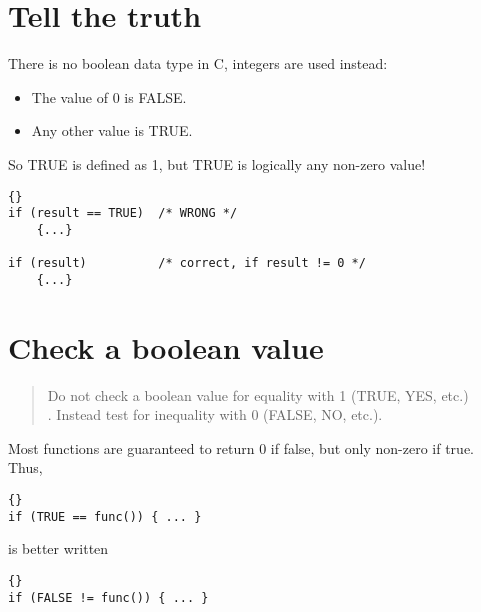 \documentclass{report}
\begin{document}
\section{Tell the truth}
There is no boolean data type in C, integers are used instead:
\begin{itemize}
\item The value of 0 is FALSE.
\item Any other value is TRUE.
\end{itemize}
So TRUE is defined as 1, but TRUE is logically any non-zero value!
\begin{lstlisting}{}
if (result == TRUE)  /* WRONG */
    {...}
	
if (result)          /* correct, if result != 0 */
    {...}
\end{lstlisting}

\section{Check a boolean value}
\begin{quote}
Do not check a boolean value for equality with 1 (TRUE, YES, etc.)\\.
Instead test for inequality with 0 (FALSE, NO, etc.).
\end{quote}
Most functions are guaranteed to return 0 if false, but only non-zero if true. Thus,
\begin{lstlisting}{}
if (TRUE == func()) { ... }
\end{lstlisting}
is better written 
\begin{lstlisting}{}
if (FALSE != func()) { ... }
\end{lstlisting}

\end{document}

